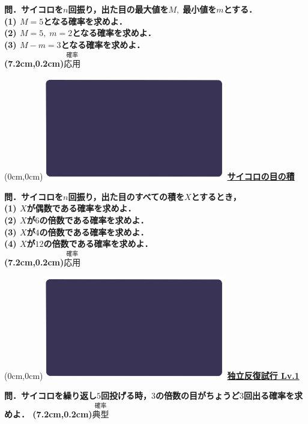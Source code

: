 \documentclass[10pt,
fleqn,
dvipdfmx,
uplatex
]{jsarticle}
\begin{document}
\normalsize 
\bf\boldmath 問．サイコロを$n$回振り，出た目の最大値を$M,\;$最小値を$m$とする．\\
(1)  $M=5$となる確率を求めよ．\\
(2)  $M=5,\;m=2$となる確率を求めよ．\\
(3)  $M-m=3$となる確率を求めよ．\\

\at(7.2cm,0.2cm){\small\color{bradorange}$\overset{\text{確率}}{\text{応用}}$}


\newpage



\at(0cm,0cm){\includegraphics[width=8cm,bb=0 0 1920 1080]{./youtube/thumbnails/templates/smart_background/確率.jpeg}}
{\color{orange}\bf\boldmath\huge\underline{サイコロの目の積}}\vspace{0.3zw}

\normalsize 
\bf\boldmath 問．サイコロを$n$回振り，出た目のすべての積を$X$とするとき，\\
(1)  $X$が偶数である確率を求めよ．\\
(2)  $X$が$6$の倍数である確率を求めよ．\\
(3)  $X$が$4$の倍数である確率を求めよ．\\
(4)  $X$が${12}$の倍数である確率を求めよ．\\

\at(7.2cm,0.2cm){\small\color{bradorange}$\overset{\text{確率}}{\text{応用}}$}


\newpage



\at(0cm,0cm){\includegraphics[width=8cm,bb=0 0 1920 1080]{./youtube/thumbnails/templates/smart_background/確率.jpeg}}
{\color{orange}\bf\boldmath\LARGE\underline{独立反復試行 Lv.1 }}\vspace{0.3zw}

\LARGE 
\bf\boldmath 問．サイコロを繰り返し$5$回投げる時，$3$の倍数の目がちょうど$3$回出る確率を求めよ．
\at(7.2cm,0.2cm){\small\color{bradorange}$\overset{\text{確率}}{\text{典型}}$}
\end{document}

